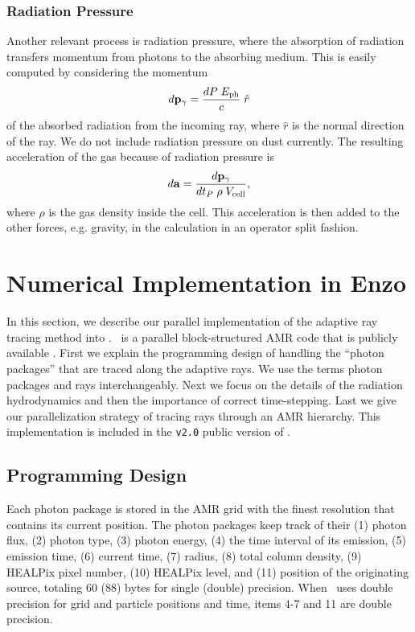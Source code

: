 \documentclass[useAMS,usenatbib,a4paper]{mn2e}
\begin{document}
\subsubsection{Radiation Pressure}

Another relevant process is radiation pressure, where the absorption
of radiation transfers momentum from photons to the absorbing medium.
This is easily computed by considering the momentum
\begin{equation}
  d\mathbf{p}_\gamma = \frac{dP \; E_{\rm ph}}{c} \; \hat{r}
\end{equation}
of the absorbed radiation from the incoming ray, where $\hat{r}$ is
the normal direction of the ray.  We do not include radiation pressure
on dust currently.  The resulting acceleration of the gas because of
radiation pressure is
\begin{equation}
  d\mathbf{a} = \frac{d\mathbf{p}_\gamma} {dt_P\; \rho \; V_{\rm cell}},
\end{equation}
where $\rho$ is the gas density inside the cell.  This acceleration is
then added to the other forces, e.g. gravity, in the calculation in an
operator split fashion.

\section{Numerical Implementation in Enzo}

In this section, we describe our parallel implementation of the
adaptive ray tracing method into \enzo.  \enzo~is a parallel
block-structured AMR \citep{BergerAMR} code that is publicly available
\citep{BryanNorman1997, OShea2004}.  First we explain the programming
design of handling the ``photon packages'' that are traced along the
adaptive rays.  We use the terms photon packages and rays
interchangeably.  Next we focus on the details of the radiation
hydrodynamics and then the importance of correct time-stepping.  Last
we give our parallelization strategy of tracing rays through an AMR
hierarchy.  This implementation is included in the \texttt{v2.0}
public version of \enzo.

\subsection{Programming Design}
\label{sec:design}

Each photon package is stored in the AMR grid with the finest
resolution that contains its current position.  The photon packages
keep track of their (1) photon flux, (2) photon type, (3) photon
energy, (4) the time interval of its emission, (5) emission time, (6)
current time, (7) radius, (8) total column density, (9) HEALPix pixel
number, (10) HEALPix level, and (11) position of the originating
source, totaling 60 (88) bytes for single (double) precision.  When
\enzo~uses double precision for grid and particle positions and time,
items 4-7 and 11 are double precision.
\end{document}
